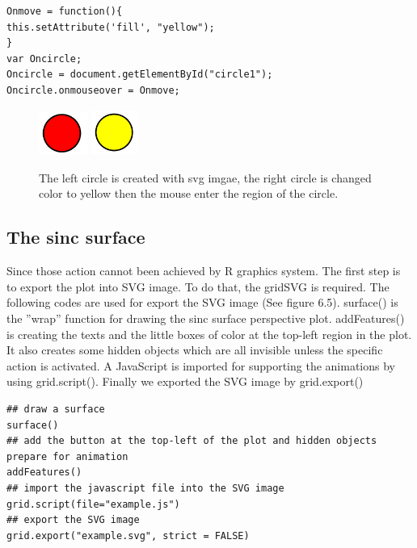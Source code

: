 \documentclass[paper=a4, fontsize=11pt]{report}
\begin{document}
\begin{lstlisting}
Onmove = function(){
this.setAttribute('fill', "yellow");
}
var Oncircle;
Oncircle = document.getElementById("circle1");
Oncircle.onmouseover = Onmove;
\end{lstlisting}

\begin{figure}[h]
	\begin{center}
		\includegraphics[height = 1.45cm, width = 1.6cm]{figure/svg/svgdemo0.PNG}
		\hspace{4cm}
		\includegraphics[height = 1.5cm, width = 1.5cm]{figure/svg/svgdemo1.PNG}
		\caption{The left circle is created with svg imgae, the right circle is changed color to yellow then the mouse enter the region of the circle. }
		\label{Example_6.3.0}
	\end{center}
\end{figure}

\subsection{The sinc surface}
Since those action cannot been achieved by R graphics system. The first step is to export the plot into
SVG image. To do that, the gridSVG is required. The following codes are used for export the SVG
image (See figure 6.5). surface() is the ''wrap'' function for drawing the sinc surface perspective plot.
addFeatures() is creating the texts and the little boxes of color at the top-left region in the plot.
It also creates some hidden objects which are all invisible unless the specific action is activated. A
JavaScript is imported for supporting the animations by using grid.script(). Finally we exported
the SVG image by grid.export()
\\

\begin{lstlisting}
## draw a surface
surface()  
## add the button at the top-left of the plot and hidden objects prepare for animation
addFeatures() 
## import the javascript file into the SVG image
grid.script(file="example.js") 
## export the SVG image
grid.export("example.svg", strict = FALSE) 
\end{lstlisting}
\end{document}
